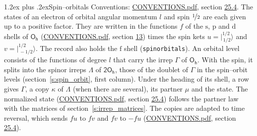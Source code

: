 \documentclass[10pt,a4paper]{article}
\makeatletter
\renewcommand\section{\@startsection{section}{1}{\z@}{-3ex plus -1ex minus -.2ex}%
  {1.2ex plus .2ex}{\normalfont\large\sffamily\bfseries\color{parttitle}}}
\numberwithin{equation}{section}
\newcommand{\grp}[1]{\mathsf{#1}}
\newcommand{\orbital}[1]{\mathrm{#1}}
\newcommand{\mult}{\kappa}
\newcommand{\intx}{\mu}
\newcommand{\jm}[2]{\bigl\lvert{}^{#1}_{\,#2}\bigr\rangle}
\makeatother
\begin{document}
\section{Spin--orbitals}\label{s:spin_orbitals}
Conventions: \href{../../CONVENTIONS.pdf}{CONVENTIONS.pdf}, section \href{../../CONVENTIONS.pdf\#conv.25.4}{25.4}.
\leavevmode\label{n:index.orbital.l}The states of an electron of orbital angular momentum $l$ and spin $\nicefrac{1}{2}$ are each given up to a positive factor. \label{n:local.spinor.uv}\label{n:local.function.f}They are written in the functions $f$ of the $\orbital{s}$, $\orbital{p}$ and $\orbital{d}$ shells of \href{../../../rotation/data/pdf/Oh.pdf}{$\grp{O_{h}}$} (\href{../../CONVENTIONS.pdf}{CONVENTIONS.pdf}, section \href{../../../rotation/CONVENTIONS.pdf\#conv.13}{13}) times the spin kets $u = \jm{1/2}{1/2}$ and $v = \jm{1/2}{-1/2}$. The record also holds the $\orbital{f}$ shell (\texttt{spinorbitals}). An orbital level consists of the functions of degree $l$ that carry the irrep $\Gamma$ of \href{../../../rotation/data/pdf/Oh.pdf}{$\grp{O_{h}}$}. With the spin, it splits into the spinor irreps $\Lambda$ of $\grp{2O_{h}}$, those of the doublet of $\Gamma$ in the spin--orbit levels (section~\ref{s:spin_orbit}, first column). \label{n:head.state}Under the heading of its shell, a row gives $\Gamma$, a copy $\mult$ of $\Lambda$ (when there are several), its partner $\intx$ and the state. The normalized state (\href{../../CONVENTIONS.pdf}{CONVENTIONS.pdf}, section \href{../../CONVENTIONS.pdf\#conv.25.4}{25.4}) follows the partner law with the matrices of section~\ref{s:irrep_matrices}. The copies are adapted to time reversal, which sends $f u$ to $f v$ and $f v$ to $-f u$ (\href{../../CONVENTIONS.pdf}{CONVENTIONS.pdf}, section \href{../../CONVENTIONS.pdf\#conv.25.4}{25.4}).
\end{document}
